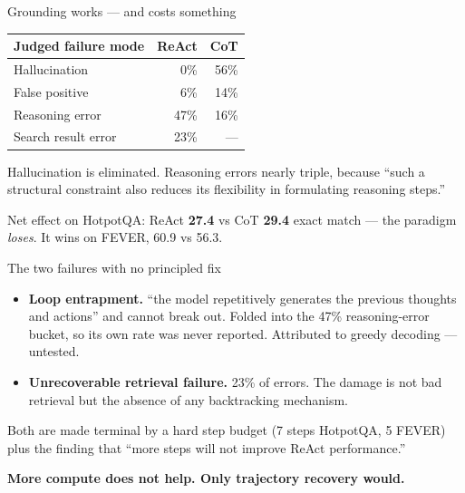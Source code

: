 \documentclass[aspectratio=169]{beamer}
\begin{document}
\begin{frame}{Grounding works --- and costs something}
  \begin{center}
  \begin{tabular}{lrr}
    \toprule
    Judged failure mode & ReAct & CoT \\
    \midrule
    Hallucination        & 0\%  & 56\% \\
    False positive       & 6\%  & 14\% \\
    Reasoning error      & 47\% & 16\% \\
    Search result error  & 23\% & --- \\
    \bottomrule
  \end{tabular}
  \end{center}

  \vspace{0.8em}
  Hallucination is eliminated. Reasoning errors nearly triple, because ``such a
  structural constraint also reduces its flexibility in formulating reasoning
  steps.''

  \vspace{0.5em}
  Net effect on HotpotQA: ReAct \textbf{27.4} vs CoT \textbf{29.4} exact match
  --- the paradigm \emph{loses}. It wins on FEVER, 60.9 vs 56.3.
\end{frame}

\begin{frame}{The two failures with no principled fix}
  \begin{itemize}
    \item \textbf{Loop entrapment.} ``the model repetitively generates the
      previous thoughts and actions'' and cannot break out. Folded into the 47\%
      reasoning-error bucket, so its own rate was never reported. Attributed to
      greedy decoding --- untested.
    \item \textbf{Unrecoverable retrieval failure.} 23\% of errors. The damage is
      not bad retrieval but the absence of any backtracking mechanism.
  \end{itemize}

  \vspace{1em}
  Both are made terminal by a hard step budget (7 steps HotpotQA, 5 FEVER) plus
  the finding that ``more steps will not improve ReAct performance.''

  \vspace{0.5em}
  \textbf{More compute does not help. Only trajectory recovery would.}
\end{frame}
\end{document}
